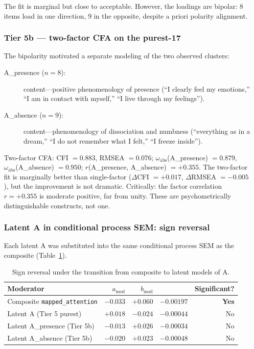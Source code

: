The fit is marginal but close to acceptable. However, the loadings are bipolar: 8 items load in one direction, 9 in the opposite, despite a priori polarity alignment.

\subsubsection{Tier 5b --- two-factor CFA on the purest-17}

The bipolarity motivated a separate modeling of the two observed clusters:
\begin{description}
    \item[A\_presence ($n = 8$):] content---positive phenomenology of presence (``I clearly feel my emotions,'' ``I am in contact with myself,'' ``I live through my feelings'').
    \item[A\_absence ($n = 9$):] content---phenomenology of dissociation and numbness (``everything as in a dream,'' ``I do not remember what I felt,'' ``I freeze inside'').
\end{description}

Two-factor CFA: CFI $= 0.883$, RMSEA $= 0.076$; $\omega_{\text{abs}}$(A\_presence) $= 0.879$, $\omega_{\text{abs}}$(A\_absence) $= 0.950$; $r$(A\_presence, A\_absence) $= +0.355$. The two-factor fit is marginally better than single-factor ($\Delta$CFI $= +0.017$, $\Delta$RMSEA $= -0.005$), but the improvement is not dramatic. Critically: the factor correlation $r = +0.355$ is moderate positive, far from unity. These are psychometrically distinguishable constructs, not one.

\subsubsection{Latent A in conditional process SEM: sign reversal}

Each latent A was substituted into the same conditional process SEM as the composite (Table~\ref{tab:a_signflip}).

\begin{table}[htbp]
\centering
\caption{Sign reversal under the transition from composite to latent models of A.}
\label{tab:a_signflip}
\small
\begin{tabular}{lrrrr}
\toprule
Moderator & $a_{\text{mod}}$ & $b_{\text{mod}}$ & \IMM{} & Significant? \\
\midrule
Composite \texttt{mapped\_attention} & $-0.033$ & $+0.060$ & $\mathbf{-0.00197}$ & \textbf{Yes} \\
Latent A (Tier 5 purest) & $+0.018$ & $-0.024$ & $-0.00044$ & No \\
Latent A\_presence (Tier 5b) & $-0.013$ & $+0.026$ & $-0.00034$ & No \\
Latent A\_absence (Tier 5b) & $-0.020$ & $+0.023$ & $-0.00048$ & No \\
\bottomrule
\end{tabular}
\end{table}

